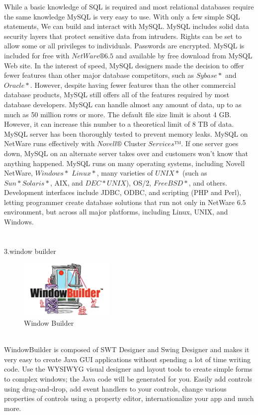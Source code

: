 \documentclass[a4paper,11pt]{IEEEtran}
\begin{document}
{While a basic knowledge of SQL is required and most relational databases require the same knowledge MySQL is very easy to use. With only a few simple SQL statements, We can build and interact with MySQL. MySQL includes solid data security layers that protect sensitive data from intruders. Rights can be set to allow some or all privileges to individuals. Passwords are encrypted. MySQL is included for free with $NetWare® 6.5$ and available by free download from MySQL Web site. In the interest of speed, MySQL designers made the decision to offer fewer features than other major database competitors, such as $Sybase*$ and $Oracle*$. However, despite having fewer features than the other commercial database products, MySQL still offers all of the features required by most database developers. MySQL can handle almost any amount of data, up to as much as 50 million rows or more. The default file size limit is about 4 GB. However, it can increase this number to a theoretical limit of 8 TB of data. MySQL server has been thoroughly tested to prevent memory leaks. MySQL on NetWare runs effectively with $Novell®$ Cluster $Services™$. If one server goes down, MySQL on an alternate server takes over and customers won't know that anything happened. MySQL runs on many operating systems, including Novell NetWare, $Windows*$ $Linux*$, many varieties of $UNIX*$ (such as $Sun* Solaris*$, AIX, and $DEC* UNIX$), OS/2, $FreeBSD*$, and others. Development interfaces include JDBC, ODBC, and scripting (PHP and Perl), letting programmer create database solutions that run not only in NetWare 6.5 environment, but across all major platforms, including Linux, UNIX, and Windows.\\\\
~\\
3.window builder
~\\
\begin{figure}[!h]
        \centering
        \includegraphics[width=0.4\textwidth]{windowbuilder.jpg}
        \caption{Window Builder}
        \label{fig1}
\end{figure}
~\\
WindowBuilder is composed of SWT Designer and Swing Designer and makes it very easy to create Java GUI applications without spending a lot of time writing code. Use the WYSIWYG visual designer and layout tools to create simple forms to complex windows; the Java code will be generated for you. Easily add controls using drag-and-drop, add event handlers to your controls, change various properties of controls using a property editor, internationalize your app and much more.
}
\end{document}
